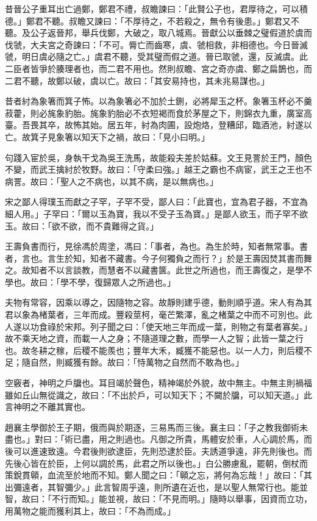\begin{pinyinscope}
昔晉公子重耳出亡過鄭，鄭君不禮，叔瞻諫曰：「此賢公子也，君厚待之，可以積德。」鄭君不聽。叔瞻又諫曰：「不厚待之，不若殺之，無令有後患。」鄭君又不聽。及公子返晉邦，舉兵伐鄭，大破之，取八城焉。晉獻公以垂棘之璧假道於虞而伐虢，大夫宮之奇諫曰：「不可。脣亡而齒寒，虞、虢相救，非相德也。今日晉滅虢，明日虞必隨之亡。」虞君不聽，受其璧而假之道。晉已取虢，還，反滅虞。此二臣者皆爭於腠理者也，而二君不用也。然則叔瞻、宮之奇亦虞、鄭之扁鵲也，而二君不聽，故鄭以破，虞以亡。故曰：「其安易持也，其未兆易謀也。」

昔者紂為象箸而箕子怖。以為象箸必不加於土鉶，必將犀玉之杯。象箸玉杯必不羹菽藿，則必旄象豹胎。旄象豹胎必不衣短褐而食於茅屋之下，則錦衣九重，廣室高臺。吾畏其卒，故怖其始。居五年，紂為肉圃，設炮烙，登糟邱，臨酒池，紂遂以亡。故箕子見象箸以知天下之禍，故曰：「見小曰明。」

句踐入宦於吳，身執干戈為吳王洗馬，故能殺夫差於姑蘇。文王見詈於王門，顏色不變，而武王擒紂於牧野。故曰：「守柔曰強。」越王之霸也不病宦，武王之王也不病詈。故曰：「聖人之不病也，以其不病，是以無病也。」

宋之鄙人得璞玉而獻之子罕，子罕不受，鄙人曰：「此寶也，宜為君子器，不宜為細人用。」子罕曰：「爾以玉為寶，我以不受子玉為寶。」是鄙人欲玉，而子罕不欲玉。故曰：「欲不欲，而不貴難得之貨。」

王壽負書而行，見徐馮於周塗，馮曰：「事者，為也。為生於時，知者無常事。書者，言也。言生於知，知者不藏書。今子何獨負之而行？」於是王壽因焚其書而舞之。故知者不以言談教，而慧者不以藏書篋。此世之所過也，而王壽復之，是學不學也。故曰：「學不學，復歸眾人之所過也。」

夫物有常容，因乘以導之，因隨物之容。故靜則建乎德，動則順乎道。宋人有為其君以象為楮葉者，三年而成。豐殺莖柯，毫芒繁澤，亂之楮葉之中而不可別也。此人遂以功食祿於宋邦。列子聞之曰：「使天地三年而成一葉，則物之有葉者寡矣。」故不乘天地之資，而載一人之身；不隨道理之數，而學一人之智；此皆一葉之行也。故冬耕之稼，后稷不能羨也；豐年大禾，臧獲不能惡也。以一人力，則后稷不足；隨自然，則臧獲有餘。故曰：「恃萬物之自然而不敢為也。」

空竅者，神明之戶牖也。耳目竭於聲色，精神竭於外貌，故中無主。中無主則禍福雖如丘山無從識之，故曰：「不出於戶，可以知天下；不闚於牖，可以知天道。」此言神明之不離其實也。

趙襄主學御於王子期，俄而與於期逐，三易馬而三後。襄主曰：「子之教我御術未盡也。」對曰：「術已盡，用之則過也。凡御之所貴，馬體安於車，人心調於馬，而後可以進速致遠。今君後則欲逮臣，先則恐逮於臣。夫誘道爭遠，非先則後也。而先後心皆在於臣，上何以調於馬，此君之所以後也。」白公勝慮亂，罷朝，倒杖而策銳貫顊，血流至於地而不知。鄭人聞之曰：「顊之忘，將何為忘哉！」故曰：「其出彌遠者，其智彌少。」此言智周乎遠，則所遺在近也，是以聖人無常行也。能並智，故曰：「不行而知。」能並視，故曰：「不見而明。」隨時以舉事，因資而立功，用萬物之能而獲利其上，故曰：「不為而成。」


\end{pinyinscope}

